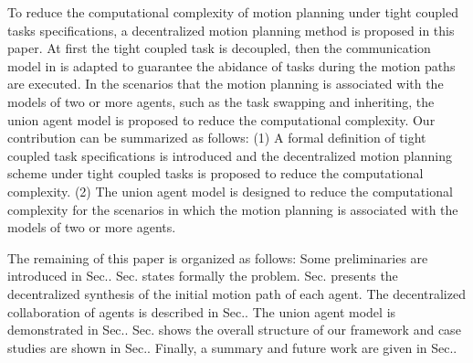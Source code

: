 \documentclass[journal]{IEEEtran}
\begin{document}
To reduce the computational complexity of motion planning under tight coupled tasks specifications, a decentralized motion planning method is proposed in this paper. At first the tight coupled task is decoupled, then the communication model in \cite{guo2017task} is adapted to guarantee the abidance of tasks during the motion paths are executed. In the scenarios that the motion planning is associated with the models of two or more agents, such as the task swapping and inheriting, the union agent model is proposed to reduce the computational complexity. Our contribution can be summarized as follows: (1) A formal definition of tight coupled task specifications is introduced and the decentralized motion planning scheme under tight coupled tasks is proposed to reduce the computational complexity. (2) The union agent model is designed to reduce the computational complexity for the scenarios in which the motion planning is associated with the models of two or more agents.

The remaining of this paper is organized as follows: Some preliminaries are introduced in Sec.\uppercase\expandafter{}. Sec.\uppercase\expandafter{} states formally the problem. Sec.\uppercase\expandafter{} presents the decentralized synthesis of the initial motion path of each agent. The decentralized collaboration of agents is described in Sec.\uppercase\expandafter{}. The union agent model is demonstrated in Sec.\uppercase\expandafter{}. Sec.\uppercase\expandafter{} shows the overall structure of our framework and case studies are shown in Sec.\uppercase\expandafter{}. Finally, a summary and future work are given in Sec.\uppercase\expandafter{}.




\end{document}
